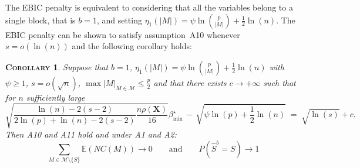 \documentclass[aos]{imsart}
\theoremstyle{plain}
\newtheorem{cor}{\textsc{Corollary}}[section]
\newcommand{\E}{\mathbb{E}}
\newcommand{\M}{\mathcal{M}}
\newcommand{\bs}{\boldsymbol}
\begin{document}
The EBIC penalty is equivalent to considering that all the variables belong to a single block, that is $b=1$, and setting $\eta_1(|M|)=\psi\ln{p\choose |M|} + \tfrac{1}{2}\ln(n)$. The EBIC penalty can be shown to satisfy assumption~A10 whenever $s=o(\ln(n))$ and the following corollary holds:
\begin{cor}
    Suppose that $b=1$, $\eta_1(|M|)=\psi \ln {p\choose |M|} + \tfrac{1}{2}\ln(n)$ with $\psi\geq1$, $s=o(\sqrt{n})$, $\max|M|_{M\in\M} \leq \tfrac{p}{2}$ and that there exists $c\to +\infty$ such that for $n$ sufficiently large
    \begin{equation}\label{eq:betaminebic}
        \sqrt{\frac{\ln(n)-2(s-2)}{2 \ln(p)+\ln(n)-2(s-2)}\frac{n\rho(\bs X)}{16}}{{\beta_{\min}^{\star}}} \,- \,\sqrt{\psi\ln(p) + \frac{1}{2}\ln(n)} \;=\; \sqrt{\ln(s)} + c .
    \end{equation}
    Then A10 and A11 hold and under A1 and A2: $$\sum_{M \in \M\setminus \{S\}}\E\left(NC(M)\right)\to 0 \qquad \mbox{and} \qquad P(\widehat{S}^b = S) \to 1$$    
\end{cor}
\end{document}
